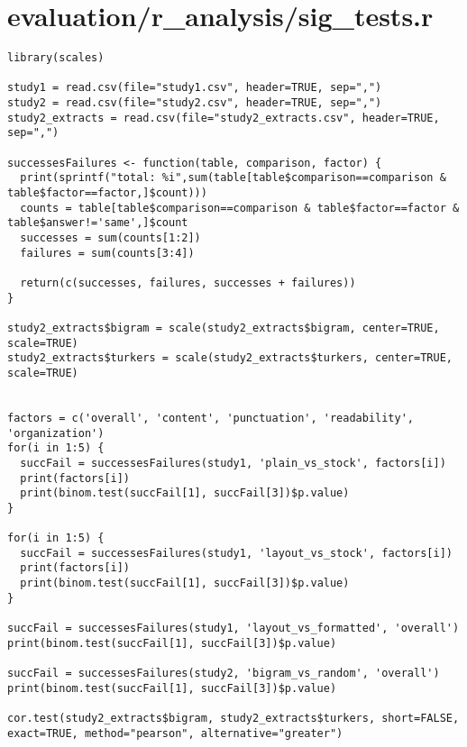 \documentclass{article}
\begin{document}
\section*{evaluation/r\_analysis/sig\_tests.r}
\begin{verbatim}
library(scales)

study1 = read.csv(file="study1.csv", header=TRUE, sep=",")
study2 = read.csv(file="study2.csv", header=TRUE, sep=",")
study2_extracts = read.csv(file="study2_extracts.csv", header=TRUE, sep=",")

successesFailures <- function(table, comparison, factor) {
  print(sprintf("total: %i",sum(table[table$comparison==comparison & table$factor==factor,]$count)))
  counts = table[table$comparison==comparison & table$factor==factor & table$answer!='same',]$count
  successes = sum(counts[1:2])
  failures = sum(counts[3:4])

  return(c(successes, failures, successes + failures))
}

study2_extracts$bigram = scale(study2_extracts$bigram, center=TRUE, scale=TRUE)
study2_extracts$turkers = scale(study2_extracts$turkers, center=TRUE, scale=TRUE)


factors = c('overall', 'content', 'punctuation', 'readability', 'organization')
for(i in 1:5) {
  succFail = successesFailures(study1, 'plain_vs_stock', factors[i])
  print(factors[i])
  print(binom.test(succFail[1], succFail[3])$p.value)
}

for(i in 1:5) {
  succFail = successesFailures(study1, 'layout_vs_stock', factors[i])
  print(factors[i])
  print(binom.test(succFail[1], succFail[3])$p.value)
}

succFail = successesFailures(study1, 'layout_vs_formatted', 'overall')
print(binom.test(succFail[1], succFail[3])$p.value)

succFail = successesFailures(study2, 'bigram_vs_random', 'overall')
print(binom.test(succFail[1], succFail[3])$p.value)

cor.test(study2_extracts$bigram, study2_extracts$turkers, short=FALSE, exact=TRUE, method="pearson", alternative="greater")


\end{verbatim}
\pagebreak
\end{document}
